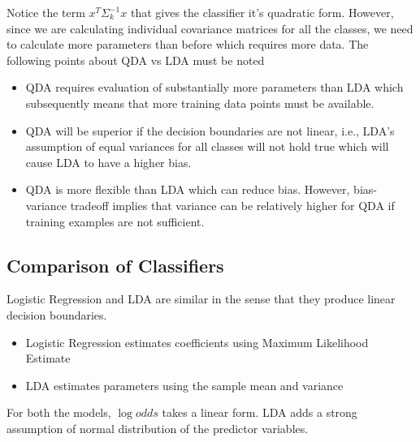 \documentclass[11pt, a4paper]{article}
\begin{document}
    Notice the term $x^{T}\Sigma_{k}^{-1}x$ that gives the classifier it's quadratic form. \newline
    However, since we are calculating individual covariance matrices for all the classes, we need to calculate more parameters than before which requires more data. \newline
    The following points about QDA vs LDA must be noted
    \begin{itemize}
        \item QDA requires evaluation of substantially more parameters than LDA which subsequently means that more training data points must be available.
        \item QDA will be superior if the decision boundaries are not linear, i.e., LDA's assumption of equal variances for all classes will not hold true which will cause LDA to have a higher bias.
        \item QDA is more flexible than LDA which can reduce bias. However, bias-variance tradeoff implies that variance can be relatively higher for QDA if training examples are not sufficient.
    \end{itemize}

    
    \subsection{Comparison of Classifiers}
    Logistic Regression and LDA are similar in the sense that they produce linear decision boundaries.
    \begin{itemize}
        \item Logistic Regression estimates coefficients using Maximum Likelihood Estimate
        \item LDA estimates parameters using the sample mean and variance
    \end{itemize}
    For both the models, $\log {odds}$ takes a linear form. LDA adds a strong assumption of normal distribution of the predictor variables.\newline
    
\end{document}
